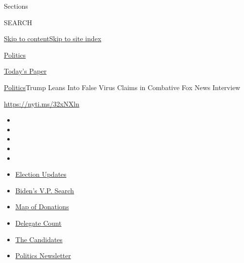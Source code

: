 Sections

SEARCH

\protect\hyperlink{site-content}{Skip to
content}\protect\hyperlink{site-index}{Skip to site index}

\href{https://www.nytimes3xbfgragh.onion/section/politics}{Politics}

\href{https://myaccount.nytimes3xbfgragh.onion/auth/login?response_type=cookie\&client_id=vi}{}

\href{https://www.nytimes3xbfgragh.onion/section/todayspaper}{Today's
Paper}

\href{/section/politics}{Politics}\textbar{}Trump Leans Into False Virus
Claims in Combative Fox News Interview

\url{https://nyti.ms/32xNXln}

\begin{itemize}
\item
\item
\item
\item
\item
\end{itemize}

\begin{itemize}
\item
  \href{https://www.nytimes3xbfgragh.onion/2020/08/03/us/elections/biden-vs-trump.html?action=click\&pgtype=Article\&state=default\&region=TOP_BANNER\&context=storylines_menu}{Election
  Updates}
\item
  \href{https://www.nytimes3xbfgragh.onion/article/biden-vice-president-2020.html?action=click\&pgtype=Article\&state=default\&region=TOP_BANNER\&context=storylines_menu}{Biden's
  V.P. Search}
\item
  \href{https://www.nytimes3xbfgragh.onion/interactive/2020/07/24/us/politics/trump-biden-campaign-donors.html?action=click\&pgtype=Article\&state=default\&region=TOP_BANNER\&context=storylines_menu}{Map
  of Donations}
\item
  \href{https://www.nytimes3xbfgragh.onion/interactive/2020/us/elections/delegate-count-primary-results.html?action=click\&pgtype=Article\&state=default\&region=TOP_BANNER\&context=storylines_menu}{Delegate
  Count}
\item
  \href{https://www.nytimes3xbfgragh.onion/interactive/2019/us/politics/2020-presidential-candidates.html?action=click\&pgtype=Article\&state=default\&region=TOP_BANNER\&context=storylines_menu}{The
  Candidates}
\item
  \href{https://www.nytimes3xbfgragh.onion/newsletters/politics?action=click\&pgtype=Article\&state=default\&region=TOP_BANNER\&context=storylines_menu}{Politics
  Newsletter}
\end{itemize}

